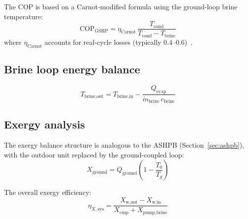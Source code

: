 The COP is based on a Carnot-modified formula using the ground-loop brine temperature:
\begin{equation}\label{eq:gshp-COP}
  \text{COP}_\text{GSHP} = \eta_\text{Carnot}\,\frac{T_\text{cond}}{T_\text{cond} - T_\text{brine}}
\end{equation}
where $\eta_\text{Carnot}$ accounts for real-cycle losses (typically 0.4--0.6)~\cite{sarbu2019}.

\subsection{Brine loop energy balance}

\begin{equation}\label{eq:gshp-brine}
  T_\text{brine,out} = T_\text{brine,in} - \frac{Q_\text{evap}}{\dot{m}_\text{brine}\,c_\text{brine}}
\end{equation}

\subsection{Exergy analysis}

The exergy balance structure is analogous to the ASHPB (Section~\ref{sec:ashpb}), with the outdoor unit replaced by the ground-coupled loop:
\begin{equation}\label{eq:gshp-Xground}
  X_\text{ground} = Q_\text{ground}\left(1 - \frac{T_0}{T_g}\right)
\end{equation}

The overall exergy efficiency:
\begin{equation}\label{eq:gshp-etaX}
  \eta_{X,\text{sys}} = \frac{X_\text{w,out} - X_\text{w,in}}{X_\text{cmp} + X_\text{pump,brine}}
\end{equation}
